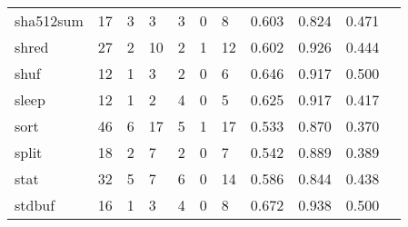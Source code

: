 \begin{longtable}{lp{1.10cm}p{1.10cm}p{1.10cm}p{1.10cm}p{1.10cm}p{1.10cm}p{1.10cm}p{1.10cm}p{1.10cm}p{1.10cm}}
sha512sum &                     17 &                                  3 &                                 3 &                                3 &                                 0 &                               8 &                          0.603 &                                 0.824 &                               0.471 \\
shred     &                     27 &                                  2 &                                10 &                                2 &                                 1 &                              12 &                          0.602 &                                 0.926 &                               0.444 \\
shuf      &                     12 &                                  1 &                                 3 &                                2 &                                 0 &                               6 &                          0.646 &                                 0.917 &                               0.500 \\
sleep     &                     12 &                                  1 &                                 2 &                                4 &                                 0 &                               5 &                          0.625 &                                 0.917 &                               0.417 \\
sort      &                     46 &                                  6 &                                17 &                                5 &                                 1 &                              17 &                          0.533 &                                 0.870 &                               0.370 \\
split     &                     18 &                                  2 &                                 7 &                                2 &                                 0 &                               7 &                          0.542 &                                 0.889 &                               0.389 \\
stat      &                     32 &                                  5 &                                 7 &                                6 &                                 0 &                              14 &                          0.586 &                                 0.844 &                               0.438 \\
stdbuf    &                     16 &                                  1 &                                 3 &                                4 &                                 0 &                               8 &                          0.672 &                                 0.938 &                               0.500 \\

\end{longtable}
